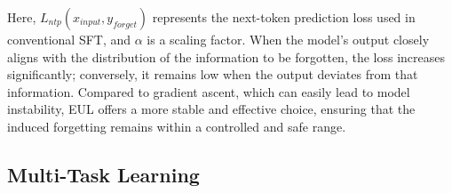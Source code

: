 \documentclass[11pt]{article}
\begin{document}


Here, $L_{ntp}(x_{input},y_{forget})$ represents the next-token prediction loss used in conventional SFT, and $\alpha$ is a scaling factor. When the model's output closely aligns with the distribution of the information to be forgotten, the loss increases significantly; conversely, it remains low when the output deviates from that information. Compared to gradient ascent, which can easily lead to model instability, EUL offers a more stable and effective choice, ensuring that the induced forgetting remains within a controlled and safe range.

\subsection{Multi-Task Learning}
\label{sec:MTL}
\end{document}
